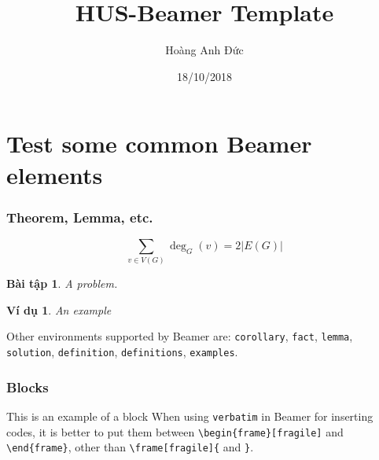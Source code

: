 \documentclass{beamer}
\title{HUS-Beamer Template}
\author{Hoàng Anh Đức}
\institute[Short Institute]{\texttt{email@address.com}\\ Long Institute}
\date{18/10/2018}
\theoremstyle{plain} %
\newtheorem{problem}{Bài tập}
\theoremstyle{example} %
\newtheorem{example}{Ví dụ}
\begin{document}
\begin{frame}
\placelogofalse %
\titlepage
\end{frame}

\placelogotrue %

\section{Test some common Beamer elements}


\begin{frame}[fragile]
	\frametitle{Theorem, Lemma, etc.}
	
	\begin{theorem}
	\[
		\sum_{v \in V(G)}\deg_G(v) = 2\vert E(G) \vert
	\]
	\end{theorem}
	
	\begin{problem}
	A problem.
	\end{problem}
	
	\begin{example}
	An example
	\end{example}
	
	Other environments supported by Beamer are: \verb+corollary+, \verb+fact+, \verb+lemma+, \verb+solution+, \verb+definition+, \verb+definitions+, \verb+examples+.
\end{frame}

\begin{frame}[fragile]
	\frametitle{Blocks}
	\begin{block}{This is an example of a block}
	When using \verb+verbatim+ in Beamer for inserting codes, it is better to put them between \verb+\begin{frame}[fragile]+ and \verb+\end{frame}+, other than \verb+\frame[fragile]{+ and \verb+}+.
	\end{block}
\end{frame}
\end{document}
